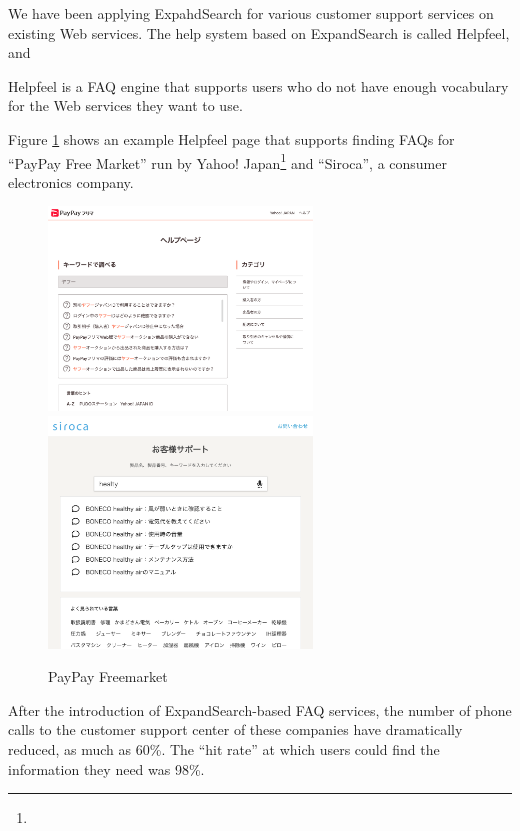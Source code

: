 \documentclass[manuscript,anonymous,review]{acmart}
\def\HF{\textsf{Helpfeel}}
\def\ES{\textsf{ExpandSearch}}
\begin{document}
We have been applying ExpahdSearch for various customer support services on existing Web services.
The help system based on {\ES} is called {\HF}, and

{\HF} is a FAQ engine that supports users who do not have enough vocabulary for the Web services they want to use.


Figure \ref{paypayhf} shows an example {\HF} page that supports finding FAQs
for ``PayPay Free Market'' run by Yahoo! Japan\footnote{
} and ``Siroca'', a consumer electronics company.

\begin{figure}[H]
  \centering
  \includegraphics[width=7cm,bb=0 0 1982 1536]{figures/a0ba0873eeada33fad1bc383598f90c1.png}
  \includegraphics[width=7cm,bb=0 0 1672 1472]{figures/6b491f2701af7193030e332686733568.png}
  \caption{PayPay Freemarket}
  \label{paypayhf}
\end{figure}

After the introduction of ExpandSearch-based FAQ services,
the number of phone calls to the customer support center of these companies have
dramatically reduced, as much as 60\%.
%
The ``hit rate'' at which users could find the information they need was 98\%.
\end{document}

